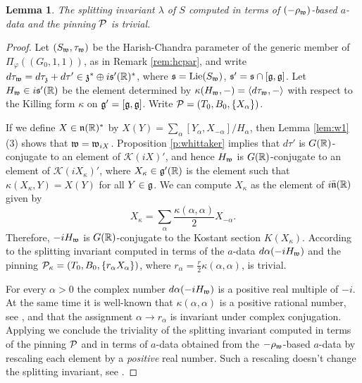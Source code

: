 \documentclass{article}
\newtheorem{lem}[thm]{Lemma}
\theoremstyle{definition}
\numberwithin{equation}{section}
\renewcommand{\-}{\hyp{}}
\newcommand{\g}{\mathfrak g}
\newcommand{\K}{\mathcal K}
\begin{document}
\begin{lem} \label{lem:gen}
The splitting invariant $\lambda$ of $S$ computed in terms of $(-\rho_{\mathfrak{w}})$-based $a$-data and the pinning $\mathcal{P}$ is trivial.
\end{lem}
\begin{proof}
Let $(S_{\mathfrak{w}},\tau_{\mathfrak{w}})$ be the Harish-Chandra parameter of the generic member of $\Pi_\varphi((G_0,1,1))$, as in Remark \ref{rem:hcpar}, and write $d\tau_{\mathfrak{w}}=d\tau_{\mathfrak{z}}+d\tau' \in \mathfrak{z}^* \oplus i\mathfrak{s}'(\mathbb{R})^*$, where $\mathfrak{s}=\textrm{Lie}(S_{\mathfrak{w}})$, $\mathfrak{s}'=\mathfrak{s} \cap [\mathfrak{g},\mathfrak{g}]$. Let $H_{\mathfrak{w}} \in i\mathfrak{s}'(\mathbb{R})$ be the element determined by $\kappa(H_{\mathfrak{w}},-)=\langle d\tau_{\mathfrak{w}},-\rangle$ with respect to the Killing form $\kappa$ on $\mf{g}'=[\g,\g]$. Write $\mathcal{P}=(T_0,B_0,\{X_\alpha\})$.

If we define $X \in \mathfrak{n}(\mathbb{R})^*$ by $X(Y) = \sum_\alpha [Y_\alpha,X_{-\alpha}]/H_\alpha$, then Lemma \ref{lem:w1}(3) shows that $\mathfrak{w}=\mathfrak{w}_{iX}$. Proposition \ref{p:whittaker} implies that $d\tau'$ is $G(\mathbb{R})$-conjugate to an element of $\K(iX)'$, and hence $H_{\mathfrak{w}}$ is $G(\mathbb{R})$-conjugate to an element of $\K(iX_\kappa)'$, where $X_\kappa \in \mathfrak{g}'(\mathbb{R})$ is the element such that $\kappa(X_\kappa,Y)=X(Y)$ for all $Y \in \mathfrak{g}$. We can compute $X_\kappa$ as the element of $i\mathfrak{\bar n}(\mathbb{R})$ given by
\[ X_\kappa = \sum_\alpha \frac{\kappa(\alpha,\alpha)}{2} X_{-\alpha}. \]
Therefore, $-iH_{\mathfrak{w}}$ is $G(\mathbb{R})$-conjugate to the Kostant section $K(X_\kappa)$. According to \cite[Theorem 5.1]{Kot99} the splitting invariant computed in terms of the $a$-data $d\alpha(-iH_{\mathfrak{w}})$ and the pinning $\mathcal{P}_\kappa=(T_0,B_0,\{r_\alpha X_\alpha\})$, where $r_\alpha = \tfrac{r}{2}\kappa(\alpha,\alpha)$, is trivial.

For every $\alpha>0$ the complex number $d\alpha(-iH_{\mathfrak{w}})$ is a positive real multiple of $-i$. At the same time it is well-known that $\kappa(\alpha,\alpha)$ is a positive rational number, see \cite[\S8.5]{Humphreys80}, and that the assignment $\alpha \to r_\alpha$ is invariant under complex conjugation. Applying \cite[Lemma 5.1]{KalGen} we conclude the triviality of the splitting invariant computed in terms of the pinning $\mathcal{P}$ and in terms of $a$-data obtained from the $-\rho_{\mathfrak{w}}$-based $a$-data by rescaling each element by a \emph{positive} real number. Such a rescaling doesn't change the splitting invariant, see \cite[(2.3.2)]{LS87}. 
\end{proof}





%

\end{document}
